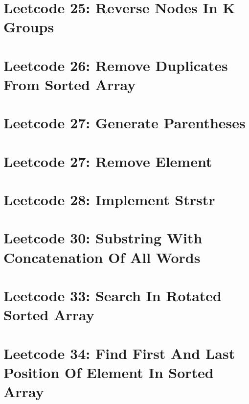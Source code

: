 \documentclass{article}
\begin{document}
\section*{Leetcode 25: Reverse Nodes In K Groups}

\pagebreak 

\section*{Leetcode 26: Remove Duplicates From Sorted Array}

\pagebreak 

\section*{Leetcode 27: Generate Parentheses}

\pagebreak 

\section*{Leetcode 27: Remove Element}

\pagebreak 

\section*{Leetcode 28: Implement Strstr}

\pagebreak 

\section*{Leetcode 30: Substring With Concatenation Of All Words}

\pagebreak 

\section*{Leetcode 33: Search In Rotated Sorted Array}

\pagebreak 

\section*{Leetcode 34: Find First And Last Position Of Element In Sorted Array}

\pagebreak 
\end{document}
